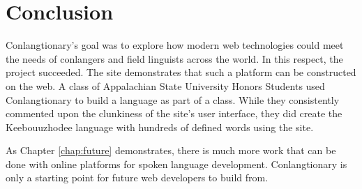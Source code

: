 \chapter{Conclusion}
\label{chap:conclusion}

Conlangtionary's goal was to explore how modern web technologies could meet the needs of conlangers and field linguists across the world. In this respect, the project succeeded. The site demonstrates that such a platform can be constructed on the web. A class of Appalachian State University Honors Students used Conlangtionary to build a language as part of a class. While they consistently commented upon the clunkiness of the site's user interface, they did create the Keebouuzhodee language with hundreds of defined words using the site.

As Chapter \ref{chap:future} demonstrates, there is much more work that can be done with online platforms for spoken language development. Conlangtionary is only a starting point for future web developers to build from.